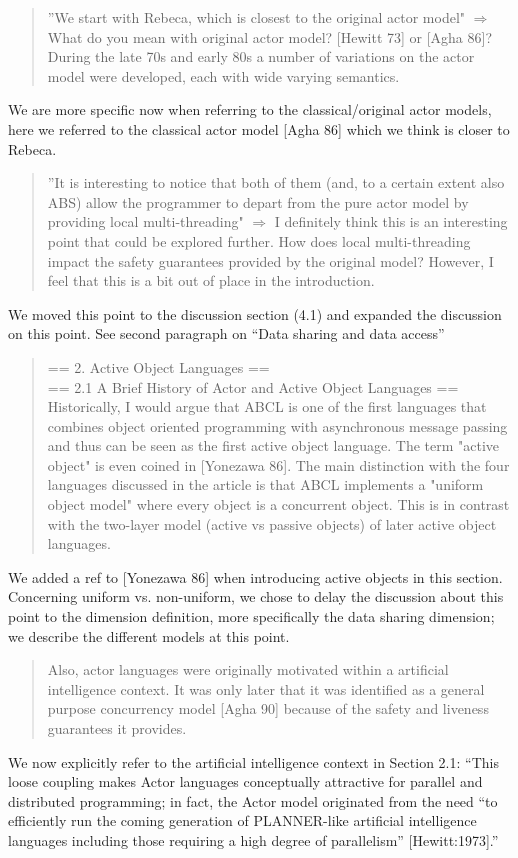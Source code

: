 \documentclass{article}
\begin{document}
 \begin{quote}
	”We start with Rebeca, which is closest to the original actor model" $\Rightarrow$ 
	What do you 
mean with original actor model? [Hewitt 73] or [Agha 86]? During the late 70s and early 
80s a number of variations on the actor model were developed, each with wide varying 
semantics.
\end{quote}
We are more specific now when referring to the classical/original actor models, 
here we referred to the classical actor model [Agha 86] which we think is closer to 
Rebeca.

\begin{quote}
	”It is interesting to notice that both of them (and, to a certain extent also ABS) 
allow the programmer to depart from the pure actor model by providing local 
multi-threading" $\Rightarrow$ I definitely think this is an interesting point that could 
be 
explored further. How does local multi-threading impact the safety guarantees provided by 
the original model? However, I feel that this is a bit out of place in the introduction.
\end{quote}
We moved this point to the discussion section (4.1) and expanded the discussion on this 
point. See second paragraph on ``Data sharing and data access''



\begin{quote}
== 2. Active Object Languages ==\\
== 2.1 A Brief History of Actor and Active Object Languages ==\\
	Historically, I would argue that ABCL is one of the first languages that combines 
	object 
oriented programming with asynchronous message passing and thus can be seen as the first 
active object language. The term "active object" is even coined in [Yonezawa 86]. The 
main distinction with the four languages discussed in the article is that ABCL implements 
a "uniform object model" where every object is a concurrent object. This is in contrast 
with the two-layer model (active vs passive objects) of later active object languages.
\end{quote}
 We added a ref to [Yonezawa 86] when introducing active objects in this section.
Concerning uniform vs. non-uniform, we chose to delay the discussion about this point to 
the 
dimension definition, more specifically the data sharing dimension;  we describe the 
different 
models at this point.


\begin{quote}
	Also, actor languages were originally motivated within a artificial intelligence 
	context. 
It was only later that it was identified as a general purpose concurrency model [Agha 90] 
because of the safety and liveness guarantees it provides.
\end{quote}
We now explicitly refer to the artificial intelligence context in Section 2.1:
``This loose coupling makes Actor languages conceptually
attractive for parallel and distributed programming; in fact, 
the Actor model originated from the need ``to efficiently run the
coming generation of PLANNER-like artificial intelligence languages
including those requiring a high degree of parallelism''
[Hewitt:1973].''
\end{document}
